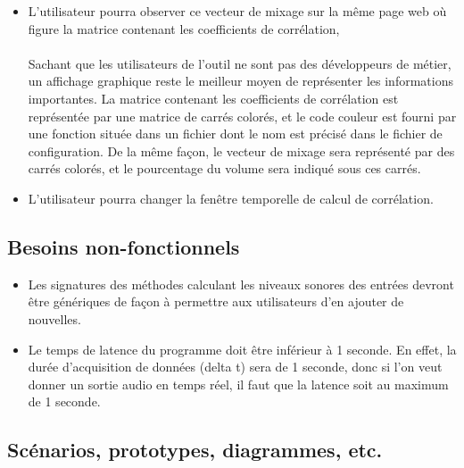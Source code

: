 \documentclass{article}
\begin{document}
\begin{itemize}
      \paragraph{}
      \item L'utilisateur pourra observer ce vecteur de mixage sur la même page
      web où figure la matrice contenant les coefficients de corrélation,
      \paragraph{}
      Sachant que les utilisateurs de l'outil ne sont pas des développeurs de
      métier, un affichage graphique reste le meilleur moyen de représenter les
      informations importantes. La matrice contenant les coefficients de
      corrélation est représentée par une matrice de carrés colorés, et le
      code couleur est fourni par une fonction située dans un fichier dont le
      nom est précisé dans le fichier de configuration. De la même façon, le
      vecteur de mixage sera représenté par des carrés colorés, et le
      pourcentage du volume sera indiqué sous ces carrés.\\

      \item L'utilisateur pourra changer la fenêtre temporelle de calcul de
      corrélation.
    \end{itemize}
    \subsection{Besoins non-fonctionnels}
    \begin{itemize}
      \item Les signatures des méthodes calculant les niveaux sonores des
      entrées devront être génériques de façon à permettre aux utilisateurs d'en
      ajouter de nouvelles.
      \item Le temps de latence du programme doit être inférieur à 1 seconde.
      En effet, la durée d'acquisition de données (delta t) sera de 1 seconde,
      donc si l'on veut donner un sortie audio en temps réel, il faut que la latence
      soit au maximum de 1 seconde.
    \end{itemize}
    \subsection{Scénarios, prototypes, diagrammes, etc.}
\end{document}
